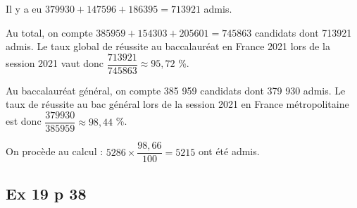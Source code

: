\documentclass[12pt,a4paper]{book}
\begin{document}
\begin{enumMet}
	\item Il y a eu $379930+147596+186395 = 713921$ admis.
	\item Au total, on compte $385959+154303+205601=745863$ candidats dont 713921 admis. Le taux global de réussite au baccalauréat en France 2021 lors de la session 2021 vaut donc $\dfrac{713921}{745863} \approx 95,72 $ \%.
	\item Au baccalauréat général, on compte 385 959 candidats dont 379 930 admis. Le taux de réussite au bac général lors de la session 2021 en France métropolitaine est donc $\dfrac{379930}{385959} \approx 98,44 $ \%.
	\item On procède au calcul : $5286 \times \dfrac{98,66}{100} = 5215$ ont été admis.
	
\end{enumMet}

\subsection*{Ex 19 p 38}
\end{document}
